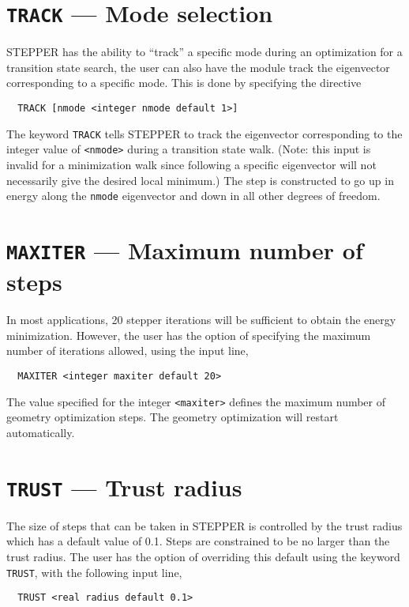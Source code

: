 \section{{\tt TRACK} --- Mode selection}

STEPPER has the ability to ``track'' a specific mode during an
optimization for a transition state search, the user can also have the
module track the eigenvector corresponding to a specific mode.  This
is done by specifying the directive 
\begin{verbatim}
  TRACK [nmode <integer nmode default 1>]
\end{verbatim}
The keyword \verb+TRACK+ tells STEPPER to track the eigenvector
corresponding to the integer value of \verb+<nmode>+ during a transition
state walk.  (Note: this input is invalid for a minimization walk
since following a specific eigenvector will not necessarily give the
desired local minimum.)  The step is constructed to go up in energy
along the \verb+nmode+ eigenvector and down in all other degrees of
freedom.

\section{{\tt MAXITER} --- Maximum number of steps}

In most applications, 20 stepper iterations will be sufficient to
obtain the energy minimization.  However, the user has the option of
specifying the maximum number of iterations allowed, using the input
line,
\begin{verbatim}
  MAXITER <integer maxiter default 20>
\end{verbatim}
The value specified for the integer \verb+<maxiter>+ defines the maximum
number of geometry optimization steps.  The geometry optimization will
restart automatically.

\section{{\tt TRUST} --- Trust radius}

The size of steps that can be taken in STEPPER is controlled by the
trust radius which has a default value of 0.1.  Steps are constrained
to be no larger than the trust radius.  The user has the option of
overriding this default using the keyword \verb+TRUST+, with the
following input line,
\begin{verbatim}
  TRUST <real radius default 0.1>
\end{verbatim}


